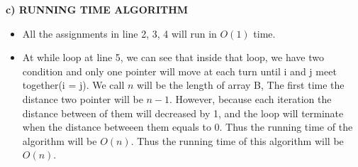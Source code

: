 \documentclass{article}
\begin{document}
\textbf{c) RUNNING TIME ALGORITHM}
\begin{itemize}
	\item  All the assignments in line 2, 3, 4 will run in \(O(1)\) time.
	\item At while loop at line 5, we can see that inside that loop, we have two condition and only one pointer will move at each turn until i and j meet together(i = j). We call \(n\) will be the length of array B, The first time the distance two pointer will be \(n - 1\). However, because each iteration the distance between of them will decreased by 1, and the loop will terminate when the distance betweeen them equals to 0. Thus the running time of the algorithm will be \(O(n)\). Thus the running time of this algorithm will be \(O(n)\).
\end{itemize}






	






	
\end{document}
